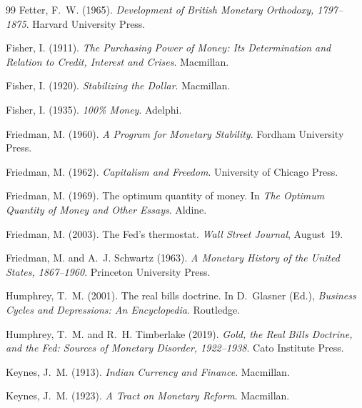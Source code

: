 \documentclass[12pt]{article}
\begin{document}
\begin{thebibliography}{99}
Fetter, F.~W. (1965).
\newblock \textit{Development of British Monetary Orthodoxy, 1797--1875}.
\newblock Harvard University Press.

Fisher, I. (1911).
\newblock \textit{The Purchasing Power of Money: Its Determination and Relation
  to Credit, Interest and Crises}.
\newblock Macmillan.

Fisher, I. (1920).
\newblock \textit{Stabilizing the Dollar}.
\newblock Macmillan.

Fisher, I. (1935).
\newblock \textit{100\% Money}.
\newblock Adelphi.

Friedman, M. (1960).
\newblock \textit{A Program for Monetary Stability}.
\newblock Fordham University Press.

Friedman, M. (1962).
\newblock \textit{Capitalism and Freedom}.
\newblock University of Chicago Press.

Friedman, M. (1969).
\newblock The optimum quantity of money.
\newblock In \textit{The Optimum Quantity of Money and Other Essays}. Aldine.

Friedman, M. (2003).
\newblock The Fed's thermostat.
\newblock \textit{Wall Street Journal}, August~19.

Friedman, M. and A.~J. Schwartz (1963).
\newblock \textit{A Monetary History of the United States, 1867--1960}.
\newblock Princeton University Press.

Humphrey, T.~M. (2001).
\newblock The real bills doctrine.
\newblock In D.~Glasner (Ed.), \textit{Business Cycles and Depressions: An
  Encyclopedia}. Routledge.

Humphrey, T.~M. and R.~H. Timberlake (2019).
\newblock \textit{Gold, the Real Bills Doctrine, and the Fed: Sources of
  Monetary Disorder, 1922--1938}.
\newblock Cato Institute Press.

Keynes, J.~M. (1913).
\newblock \textit{Indian Currency and Finance}.
\newblock Macmillan.

Keynes, J.~M. (1923).
\newblock \textit{A Tract on Monetary Reform}.
\newblock Macmillan.


\end{thebibliography}
\end{document}
